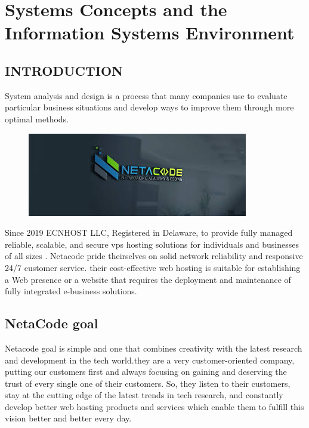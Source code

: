 \documentclass[a4paper,12pt]{report}
\begin{document}
\chapter{Systems Concepts and the Information Systems Environment}
\section{INTRODUCTION}
 System analysis and design is a process that many companies use to evaluate particular business situations and develop ways to improve them through more optimal methods.\\
 
\begin{figure}[h]
	\centering
	\includegraphics[width=0.9\linewidth]{1_1}
	\label{fig:11}
\end{figure}

 Since 2019 ECNHOST LLC, Registered in Delaware, to provide fully managed reliable, scalable, and
 secure vps hosting solutions for individuals and businesses of all sizes . Netacode pride theirselves on solid
 network reliability and responsive 24/7 customer service. their cost-effective web hosting is suitable for
 establishing a Web presence or a website that requires the deployment and maintenance of fully
 integrated e-business solutions.
\section{NetaCode goal}
Netacode goal is simple and one that combines creativity with the latest research and development in the tech
world.they are a very customer-oriented company, putting our customers first and always focusing on
gaining and deserving the trust of every single one of their customers. So, they listen to their customers, stay
at the cutting edge of the latest trends in tech research, and constantly develop better web hosting
products and services which enable them to fulfill this vision better and better every day.
\\
\\
\end{document}
